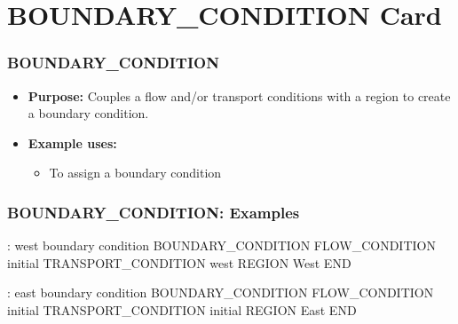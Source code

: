 \section{BOUNDARY\_CONDITION Card}

\begin{frame}\frametitle{BOUNDARY\_CONDITION}

\begin{itemize}
\item[] \textbf{Purpose:} Couples a flow and/or transport conditions with a region to create a boundary condition.
\item[] \textbf{Example uses:}
\begin{itemize}
  \item To assign a boundary condition
\end{itemize}
\end{itemize}

\end{frame}

\begin{frame}[fragile]\frametitle{BOUNDARY\_CONDITION: Examples}

\begin{semiverbatim}
\scriptsize
: west boundary condition
BOUNDARY_CONDITION
  FLOW_CONDITION initial
  TRANSPORT_CONDITION west
  REGION West
END

: east boundary condition
BOUNDARY_CONDITION
  FLOW_CONDITION initial
  TRANSPORT_CONDITION initial
  REGION East
END

\end{semiverbatim}


\end{frame}
